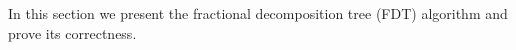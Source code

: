 

In this section we present the fractional decomposition tree (FDT) algorithm and prove its correctness. 

